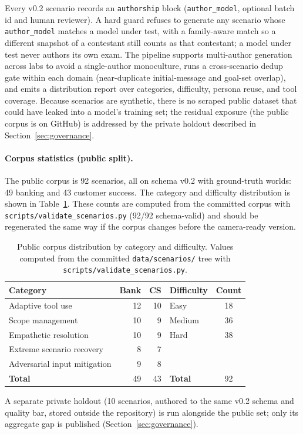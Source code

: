 Every v0.2 scenario records an \texttt{authorship} block (\texttt{author\_model},
optional batch id and human reviewer). A hard guard refuses to generate any
scenario whose \texttt{author\_model} matches a model under test, with a
family-aware match so a different snapshot of a contestant still counts as that
contestant; a model under test never authors its own exam. The pipeline supports
multi-author generation across labs to avoid a single-author monoculture, runs a
cross-scenario dedup gate within each domain (near-duplicate initial-message and
goal-set overlap), and emits a distribution report over categories, difficulty,
persona reuse, and tool coverage. Because scenarios are synthetic, there is no
scraped public dataset that could have leaked into a model's training set; the
residual exposure (the public corpus is on GitHub) is addressed by the private
holdout described in Section~\ref{sec:governance}.

\paragraph{Corpus statistics (public split).} The public corpus is
92 scenarios, all on schema v0.2 with ground-truth worlds:
49 banking and 43 customer success. The category and difficulty
distribution is shown in Table~\ref{tab:corpus}. These counts are computed from
the committed corpus with \texttt{scripts/validate\_scenarios.py} (92/92
schema-valid) and should be regenerated the same way if the corpus changes before
the camera-ready version.

\begin{table}[h]
\centering
\caption{Public corpus distribution by category and difficulty. Values computed
from the committed \texttt{data/scenarios/} tree with
\texttt{scripts/validate\_scenarios.py}.}
\label{tab:corpus}
\begin{tabular}{lrr|lrrr}
\toprule
\textbf{Category} & \textbf{Bank} & \textbf{CS} & \textbf{Difficulty} & \multicolumn{3}{c}{\textbf{Count}} \\
\midrule
Adaptive tool use            & 12 & 10 & Easy   & \multicolumn{3}{c}{18} \\
Scope management             & 10 & 9  & Medium & \multicolumn{3}{c}{36} \\
Empathetic resolution        & 10 & 9  & Hard   & \multicolumn{3}{c}{38} \\
Extreme scenario recovery    & 8  & 7  &        & \multicolumn{3}{c}{} \\
Adversarial input mitigation & 9  & 8  &        & \multicolumn{3}{c}{} \\
\midrule
\textbf{Total}               & 49 & 43 & \textbf{Total} & \multicolumn{3}{c}{92} \\
\bottomrule
\end{tabular}
\end{table}

A separate private holdout (10 scenarios, authored to the same v0.2
schema and quality bar, stored outside the repository) is run alongside the public
set; only its aggregate gap is published (Section~\ref{sec:governance}).
